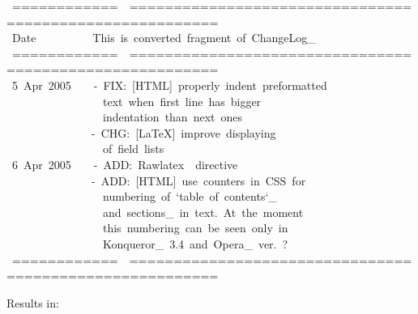 \documentclass[12pt]{article}
\begin{document}
\begin{ttfamily}\begin{flushleft}
\mbox{~============~~========================================================}\\
\mbox{~Date~~~~~~~~~~This~is~converted~fragment~of~ChangeLog\_}\\
\mbox{~============~~========================================================}\\
\mbox{~5~Apr~2005~~~~-~FIX:~[HTML]~properly~indent~preformatted~~~~~~~~~~~~~~}\\
\mbox{~~~~~~~~~~~~~~~~~text~when~first~line~has~bigger~~~~~~~~~~~~~~~~~~~~~~~}\\
\mbox{~~~~~~~~~~~~~~~~~indentation~than~next~ones~~~~~~~~~~~~~~~~~~~~~~~~~~~~}\\
\mbox{~~~~~~~~~~~~~~~-~CHG:~[\LaTeX{}]~improve~displaying~~~~~~~~~~~~~~~~~~~~~~~}\\
\mbox{~~~~~~~~~~~~~~~~~of~field~lists~~~~~~~~~~~~~~~~~~~~~~~~~~~~~~~~~~~~~~~~}\\
\mbox{~6~Apr~2005~~~~-~ADD:~Rawlatex~~directive~~~~~~~~~~~~~~~~~~~~~~~~~~~~~~}\\
\mbox{~~~~~~~~~~~~~~~-~ADD:~[HTML]~use~counters~in~CSS~for~~~~~~~~~~~~~~~~~~~}\\
\mbox{~~~~~~~~~~~~~~~~~numbering~of~`table~of~contents`\_~~~~~~~~~~~~~~~~~~~~~}\\
\mbox{~~~~~~~~~~~~~~~~~and~sections\_~in~text.~At~the~moment~~~~~~~~~~~~~~~~~~}\\
\mbox{~~~~~~~~~~~~~~~~~this~numbering~can~be~seen~only~in~~~~~~~~~~~~~~~~~~~~}\\
\mbox{~~~~~~~~~~~~~~~~~Konqueror\_~3.4~and~Opera\_~ver.~?~~~~~~~~~~~~~~~~~~~~~~}\\
\mbox{~============~~========================================================}\\
\end{flushleft}\end{ttfamily}

Results in:
\end{document}
